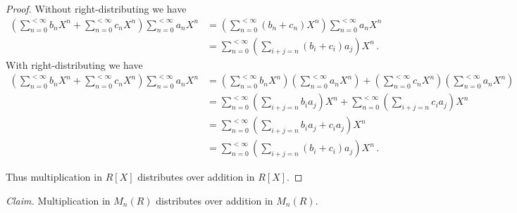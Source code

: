 \documentclass{abrice}
\begin{document}
\begin{proof}
  Without right-distributing we have
  \begin{align*}
    \left( \sum_{n=0}^{< \infty} b_n X^n + \sum_{n=0}^{< \infty} c_n X^n \right)
    \sum_{n=0}^{< \infty} a_n X^n
    &= \left( \sum_{n=0}^{< \infty} (b_n + c_n) X^n \right) \sum_{n=0}^{< \infty} a_n X^n \\
    &= \sum_{n=0}^{< \infty} \left( \sum_{i+j=n} (b_i +c_i) a_j \right) X^n \, .
  \end{align*}
  With right-distributing we have
  \begin{align*}
    \left( \sum_{n=0}^{< \infty} b_n X^n + \sum_{n=0}^{< \infty} c_n X^n \right)
    \sum_{n=0}^{< \infty} a_n X^n
    &= \left( \sum_{n=0}^{< \infty} b_n X^n \right)
      \left( \sum_{n=0}^{< \infty} a_n X^n \right) +
      \left( \sum_{n=0}^{< \infty} c_n X^n \right)
      \left( \sum_{n=0}^{< \infty} a_n X^n \right) \\
    &= \sum_{n=0}^{< \infty} \left( \sum_{i+j=n}  b_i a_j \right) X^n +
      \sum_{n=0}^{< \infty} \left( \sum_{i+j=n} c_i a_j \right) X^n \\
    &= \sum_{n=0}^{< \infty} \left( \sum_{i+j=n} b_i a_j + c_i a_j \right) X^n \\
    &= \sum_{n=0}^{< \infty} \left( \sum_{i+j=n} (b_i + c_i) a_j \right) X^n\, .
  \end{align*}

  Thus multiplication in $R[X]$ distributes over addition in $R[X]$.
\end{proof}

\noindent
\emph{Claim.} Multiplication in $M_n(R)$ distributes over addition in $M_n(R)$.
\end{document}
